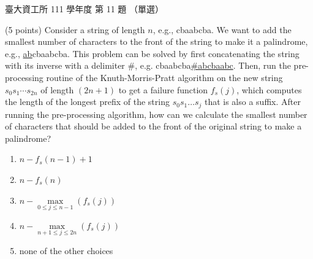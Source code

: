 \begin{pastexam}[label={px:ntu-111-dsaa-11}]{臺大資工所 111 學年度 第 11 題}
（單選）

(5 points) Consider a string of length $n$, e.g., cbaabcba. We want to add the smallest number
of characters to the front of the string to make it a palindrome, e.g., \underline{ab}cbaabcba.
This problem can be solved by first concatenating the string with its inverse with a delimiter
\#, e.g. cbaabcba\underline{\#abcbaabc}. Then, run the pre-processing routine of the
Knuth-Morris-Pratt algorithm on the new string $s_0s_1\cdots s_{2n}$ of length $(2n+1)$ to get
a failure function $f_s(j)$, which computes the length of the longest prefix of the string
$s_0s_1\ldots s_j$ that is also a suffix. After running the pre-processing algorithm, how can we
calculate the smallest number of characters that should be added to the front of the original
string to make a palindrome?
\begin{enumerate}[label=(\Alph*)]
\item $n-f_s(n-1)+1$
\item $n-f_s(n)$
\item $n-\max\limits_{0\le j\le n-1}(f_s(j))$
\item $n-\max\limits_{n+1\le j\le 2n}(f_s(j))$
\item none of the other choices
\end{enumerate}
\end{pastexam}

